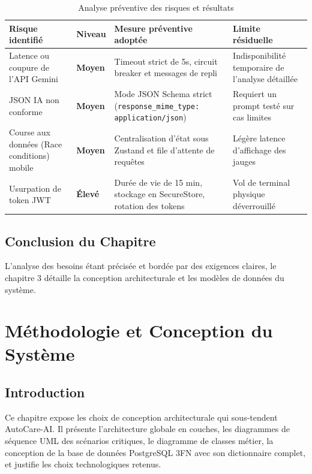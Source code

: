 \documentclass[12pt,a4paper,oneside]{report}
\begin{document}
\begin{table}[H]
\centering
\small
\begin{tabularx}{\textwidth}{p{3.2cm} p{1.8cm} X p{2.8cm}}
\toprule
\textbf{Risque identifi\'e} & \textbf{Niveau} & \textbf{Mesure pr\'eventive adopt\'ee} & \textbf{Limite r\'esiduelle} \\
\midrule
Latence ou coupure de l'API Gemini & \textcolor{accentOrange}{\textbf{Moyen}} & Timeout strict de 5s, circuit breaker et messages de repli & Indisponibilit\'e temporaire de l'analyse d\'etaill\'ee \\
\midrule
JSON IA non conforme & \textcolor{accentOrange}{\textbf{Moyen}} & Mode JSON Schema strict (\texttt{response\_mime\_type: application/json}) & Requiert un prompt test\'e sur cas limites \\
\midrule
Course aux donn\'ees (Race conditions) mobile & \textcolor{accentOrange}{\textbf{Moyen}} & Centralisation d'\'etat sous Zustand et file d'attente de requ\^etes & L\'eg\`ere latence d'affichage des jauges \\
\midrule
Usurpation de token JWT & \textcolor{crimsonDark}{\textbf{\'Elev\'e}} & Dur\'ee de vie de 15 min, stockage en SecureStore, rotation des tokens & Vol de terminal physique d\'everrouill\'e \\
\bottomrule
\end{tabularx}
\caption{Analyse pr\'eventive des risques et r\'esultats}
\label{tab:risques_ch2}
\end{table}

\section{Conclusion du Chapitre}
L'analyse des besoins \'etant pr\'ecis\'ee et bord\'ee par des exigences claires, le chapitre 3 d\'etaille la conception architecturale et les mod\`eles de donn\'ees du syst\`eme.

\clearpage
\chapter{M\'ethodologie et Conception du Syst\`eme}

\section{Introduction}
Ce chapitre expose les choix de conception architecturale qui sous-tendent AutoCare-AI. Il pr\'esente l'architecture globale en couches, les diagrammes de s\'equence UML des sc\'enarios critiques, le diagramme de classes m\'etier, la conception de la base de donn\'ees PostgreSQL 3FN avec son dictionnaire complet, et justifie les choix technologiques retenus.
\end{document}
